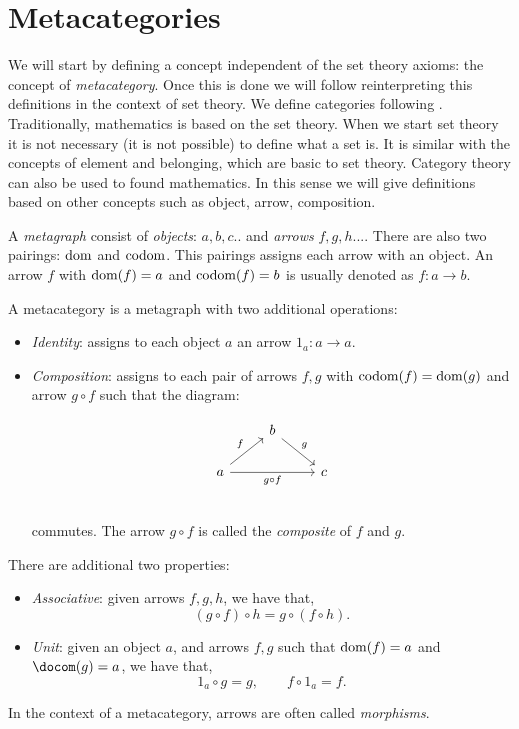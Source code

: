 \section{Metacategories}
We will start by defining a concept independent of the set theory axioms: the concept of \emph{metacategory}. Once this is done we will follow reinterpreting this definitions in the context of set theory. We define categories following  \cite{mac2013categories}.\\


Traditionally, mathematics is based on the set theory. When we start set theory it is not necessary (it is not possible) to define what a set is. It is similar with the concepts of element and belonging, which are basic to set theory. Category theory can also be used to found mathematics. In this sense we will give definitions based on other concepts such as object, arrow, composition. \\

\begin{definition}
  A \emph{metagraph} consist of \emph{objects}: $a,b,c..$ and \emph{arrows} $f,g,h...$. There are also two pairings: $\operatorname{dom}$ and $\operatorname{codom}$. This pairings assigns each arrow with an object. An arrow $f$ with $\operatorname{dom}(f)=a$ and $\operatorname{codom}(f)=b$ is usually denoted as $f:a\to b$.\\
\end{definition}

\begin{definition}
  A metacategory  is a metagraph with two additional operations:
  \begin{itemize}
  \item \emph{Identity}: assigns to each object $a$ an arrow $1_a:a\to a$. 
  \item \emph{Composition}: assigns to each pair of arrows $f,g$ with $\operatorname{codom}(f)=\operatorname{dom}(g)$ and arrow $g\circ f$ such that the diagram:

    \[
      \begin{tikzcd}
        & b \arrow[rd, "g"]& \\
        a\arrow[ru, "f"] \arrow[rr, "g\circ f",swap] && c\\
      \end{tikzcd}
    \]

    commutes. The arrow $g\circ f$ is called the \emph{composite} of $f$  and $g$.
  \end{itemize}

  There are additional two properties:
  \begin{itemize}
  \item \emph{Associative}: given arrows $f,g,h$, we have that,
    $$(g\circ f) \circ h = g \circ (f \circ h).$$
  \item \emph{Unit}: given an object $a$, and arrows $f,g$ such that $\operatorname{dom} (f)= a$ and $\docom (g) = a$, we have that,
    $$1_a \circ g = g, \qquad f \circ 1_a = f.$$
  \end{itemize}
  In the context of a metacategory, arrows are often called \emph{morphisms}.
\end{definition}

